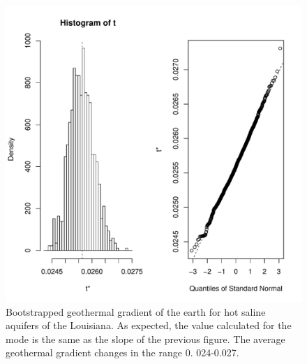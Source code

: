 \documentclass[review,authoryear, 12pt]{elsarticle}\usepackage[]{graphicx}\usepackage[]{color}
\makeatletter
\def\maxwidth{ %
  \ifdim\Gin@nat@width>\linewidth
    \linewidth
  \else
    \Gin@nat@width
  \fi
}
\newenvironment{knitrout}{}{} %
\makeatother
\begin{document}
\begin{knitrout}
\color{fgcolor}\begin{figure}[]

\includegraphics[width=\maxwidth]{figure/bootstrap_plot} \caption[Bootstrapped geothermal gradient of the earth for hot saline aquifers of the Louisiana]{Bootstrapped geothermal gradient of the earth for hot saline aquifers of the Louisiana. As expected, the value calculated for the mode is the same as the slope of the previous figure. The average geothermal gradient changes in the range 0. 024-0.027.\label{Fig:bootstrap_plot}}
\end{figure}


\end{knitrout}






\end{document}
